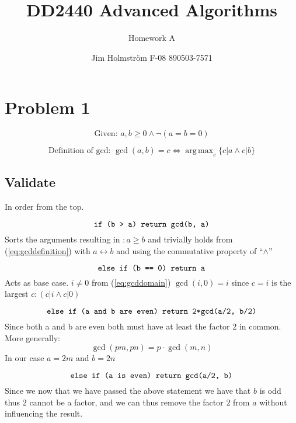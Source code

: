 \documentclass[a4paper,twoside=false,abstract=false,numbers=noenddot,
titlepage=false,headings=small,parskip=half,version=last]{scrartcl}
\author{Jim Holmström F-08 890503-7571}
\title{DD2440 Advanced Algorithms}
\subtitle{Homework A}
\DeclareMathOperator*{\argmax}{arg\,max}
\begin{document}
\maketitle

\section{Problem 1}

\begin{equation} \label{eq:gcddomain}
    \text{Given: }    a,b \ge 0 \wedge \neg(a=b=0)
\end{equation}

\begin{equation} \label{eq:gcddefinition}
   \text{Definition of gcd: } \gcd(a,b)=c \iff \argmax_c \{c|a \wedge c|b\}
\end{equation}

\subsection{Validate}

In order from the top.

\begin{equation} \label{eq:statement1}
    \verb+if (b > a) return gcd(b, a)+
\end{equation}
Sorts the arguments resulting in $: a \ge b$ and trivially holds from (\ref{eq:gcddefinition}) with $a \leftrightarrow b$ and using the commutative property of ``$\wedge$''

\begin{equation} \label{eq:statement2}
    \verb+else if (b == 0) return a+
\end{equation}
Acts as base case. $i \neq 0$ from (\ref{eq:gcddomain}) $\gcd(i,0)=i$ since $c=i$ is the largest $c : (c|i \wedge c|0)$

\begin{equation} \label{eq:statement3}
    \verb+else if (a and b are even) return 2*gcd(a/2, b/2)+ 
\end{equation}
Since both a and b are even both must have at least the factor 2 in common.
More generally:
\begin{equation}
    \gcd(pm,pn)=p\cdot \gcd(m,n)
\end{equation}
In our case $a=2m$ and $b=2n$

\begin{equation} \label{eq:statement4}
    \verb+else if (a is even) return gcd(a/2, b)+
\end{equation}
Since we now that we have passed the above statement we have that $b$ is odd thus $2$ cannot be a factor, and we can thus remove the factor $2$ from $a$ without influencing the result.
\end{document}
